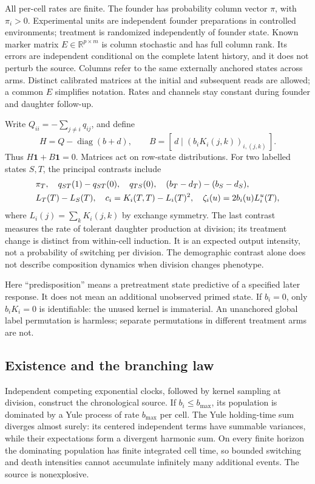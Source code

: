 \documentclass[11pt]{article}
\theoremstyle{definition}
\newcommand{\one}{\mathbf 1}
\newcommand{\diag}{\operatorname{diag}}
\newcommand{\R}{\mathbb R}
\begin{document}
All per-cell rates are finite. The founder has probability column vector $\pi$,
with $\pi_i>0$. Experimental units are independent founder preparations in
controlled environments; treatment is randomized independently of founder state.
Known marker matrix $E\in\R^{p\times m}$ is column stochastic and has full
column rank. Its errors are independent conditional on the complete latent
history, and it does not perturb the source. Columns refer to the same
externally anchored states across arms. Distinct calibrated matrices at the
initial and subsequent reads are allowed; a common $E$ simplifies notation.
Rates and channels stay constant during founder and daughter follow-up.

Write $Q_{ii}=-\sum_{j\ne i}q_{ij}$, and define
\begin{equation}\label{eq:HB}
 H=Q-\diag(b+d),\qquad B=[\,d\mid (b_iK_i(j,k))_{i,(j,k)}\,].
\end{equation}
Thus $H\one+B\one=0$. Matrices act on row-state distributions. For two labelled
states $S,T$, the principal contrasts include
\begin{align}\label{eq:estimand}
 &\pi_T,\quad q_{ST}(1)-q_{ST}(0),\quad q_{TS}(0),\quad
 (b_T-d_T)-(b_S-d_S),\notag\\
 &L_T(T)-L_S(T),\quad c_i=K_i(T,T)-L_i(T)^2,\quad
 \zeta_i(u)=2b_i(u)L_i^u(T),
\end{align}
where $L_i(j)=\sum_kK_i(j,k)$ by exchange symmetry. The last contrast measures
the rate of tolerant daughter production at division; its treatment change is
distinct from within-cell induction. It is an expected output intensity, not a
probability of switching per division. The demographic contrast alone does not
describe composition dynamics when division changes phenotype.

Here ``predisposition'' means a pretreatment state predictive of a specified
later response. It does not mean an additional unobserved primed state. If
$b_i=0$, only $b_iK_i=0$ is identifiable: the unused kernel is immaterial. An
unanchored global label permutation is harmless; separate permutations in
different treatment arms are not.

\subsection{Existence and the branching law}
Independent competing exponential clocks, followed by kernel sampling at
division, construct the chronological source. If $b_i\le b_{\max}$, its
population is dominated by a Yule process of rate $b_{\max}$ per cell. The Yule
holding-time sum diverges almost surely: its centered independent terms have
summable variances, while their expectations form a divergent harmonic sum. On
every finite horizon the dominating population has finite integrated cell time,
so bounded switching and death intensities cannot accumulate infinitely many
additional events. The source is nonexplosive.
\end{document}
